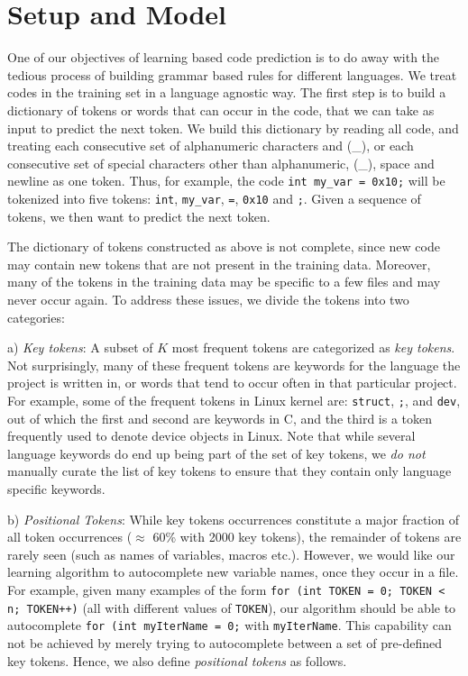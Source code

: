 \section{Setup and Model}
\label{sec:model}

\noindent
One of our objectives of learning based code prediction is to do away with the
tedious process of building grammar based rules for different languages.
We treat codes in the training set in a language agnostic way. The first step
is to build a dictionary of tokens or words that can occur in the code, that we
can take as input to predict the next token. We build this dictionary by
reading all code, and treating each consecutive set of alphanumeric characters
and (\_), or each consecutive set of special characters other
than alphanumeric, (\_), space and newline as one token.
Thus, for example, the code {\tt int my\_var = 0x10;} will be tokenized into five
tokens: {\tt int}, {\tt my\_var}, {\tt =}, {\tt 0x10} and {\tt ;}. Given a sequence of
tokens, we then want to predict the next token.

The dictionary of tokens constructed as above is not complete, since new code
may contain new tokens that are not present in the training data. Moreover,
many of the tokens in the training data may be specific to a few files and may
never occur again. To address these issues, we divide the tokens into two
categories:

a) {\it Key tokens}: A subset of $K$ most frequent tokens are categorized as
{\it key tokens}. Not surprisingly, many of
these frequent tokens are keywords for the language the project is written in,
or words that tend to occur often in that
particular project.
For example, some of the frequent tokens in Linux kernel are:
\texttt{struct}, \texttt{;}, and \texttt{dev}, out of which the first and second
are keywords in C, and the third is a token frequently used to denote device
objects in Linux. Note that while several language keywords do end up being part
of the set of key tokens, we {\it do not} manually curate the list of key tokens
to ensure that they contain only language specific keywords.

b) {\it Positional Tokens}: While key tokens occurrences constitute a major
fraction of all token occurrences ($\approx$ 60\% with 2000 key tokens),
the remainder of tokens are rarely
seen (such as names of variables, macros etc.). However, we would like our
learning algorithm to autocomplete new variable names, once they occur in a
file. For
example, given many examples of the form {\tt for (int TOKEN = 0; TOKEN < n;
TOKEN++)} (all with different values of {\tt TOKEN}), our algorithm should be
able to autocomplete {\tt for (int myIterName = 0;} with {\tt myIterName}. This
capability can not be achieved by merely trying to autocomplete between a set of
pre-defined key tokens. Hence, we also define {\it positional tokens} as follows.

